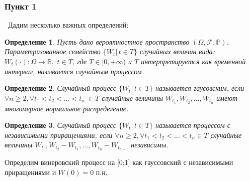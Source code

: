 \documentclass[oneside, final, 12pt]{article}
\newtheorem{definition}{Определение}
\begin{document}
\subsubsection{Пункт 1}\
	Дадим несколько важных определений:
	\begin{definition}
		Пусть дано вероятностное пространство $(\Omega, \mathcal{F}, \mathbb{P})$.
		Параметризованное семейство $\{W_t |\, t \in T\}$ случайных величин вида: 
			$W_t(\cdot): \Omega \rightarrow \mathbb{R}, \,\, t\in T$, где $T\in[0,+\infty)$ и $T$ интерпретируется 
			как временной интервал, называется случайным процессом.
	\end{definition}
	\begin{definition}
		Случайный процесс $\{W_t |\, t \in T\}$ называется гаусовским, если
		$\forall n\geqslant 2, \forall t_1<t_2<\ldots<t_n \ \in T$ случайные величины
		$W_{t_1}, W_{t_2}, \ldots, W_{t_n}$ имеют многомерное нормальное распределение.
	\end{definition}
	\begin{definition}
		Случайный процесс $\{W_t |\, t \in T\}$ называется процессом с независимыми приращениями, если
		$\forall n\geqslant 2, \forall t_1<t_2<\ldots<t_n \in T$ случайные величины
		$W_{t_1}, W_{t_2}- W_{t_1}, \ldots, W_{t_n} -W_{t_{n-1}} $ независимы.
	\end{definition}
	Определим винеровский процесс на [0;1] как гауссовский с независимыми приращениями и $W(0)=0$ п.н.
	
\end{document}
